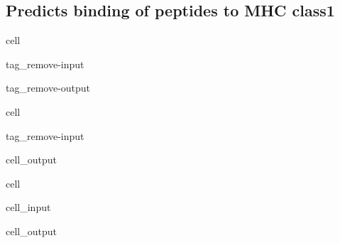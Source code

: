 \documentclass[letterpaper,10pt,english]{jupyterBook}
\begin{document}
\subsection{Predicts binding of peptides to MHC class1}
\label{\detokenize{ipynb/chapter2:predicts-binding-of-peptides-to-mhc-class1}}
\begin{sphinxuseclass}{cell}
\begin{sphinxuseclass}{tag_remove-input}
\begin{sphinxuseclass}{tag_remove-output}
\end{sphinxuseclass}
\end{sphinxuseclass}
\end{sphinxuseclass}
\begin{sphinxuseclass}{cell}
\begin{sphinxuseclass}{tag_remove-input}\begin{sphinxVerbatimOutput}

\begin{sphinxuseclass}{cell_output}
\noindent{}

\end{sphinxuseclass}\end{sphinxVerbatimOutput}

\end{sphinxuseclass}
\end{sphinxuseclass}
\begin{sphinxuseclass}{cell}\begin{sphinxVerbatimInput}

\begin{sphinxuseclass}{cell_input}
\begin{sphinxVerbatim}[commandchars=\\\{\}]
     
\end{sphinxVerbatim}

\end{sphinxuseclass}\end{sphinxVerbatimInput}
\begin{sphinxVerbatimOutput}

\begin{sphinxuseclass}{cell_output}
\noindent{}

\end{sphinxuseclass}\end{sphinxVerbatimOutput}

\end{sphinxuseclass}
\end{document}
